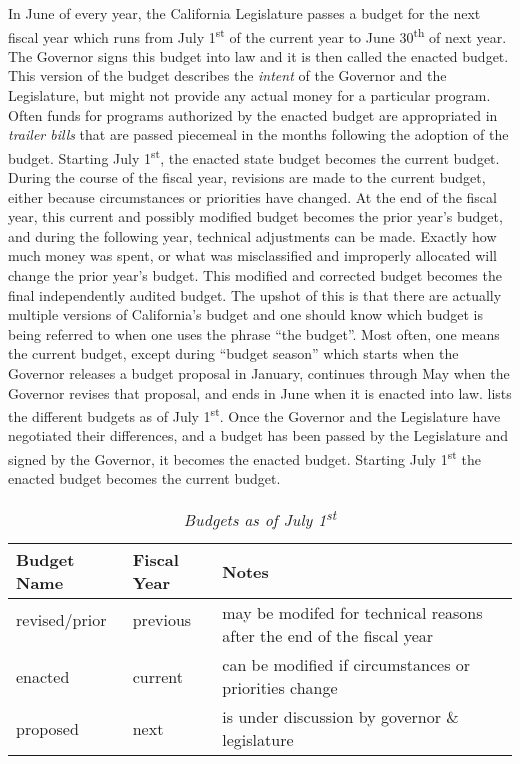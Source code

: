 In June of every year, the California Legislature passes a budget for the next fiscal year which runs from July 1\textsuperscript{st} of the current year to June 30\textsuperscript{th} of next year. The Governor signs this budget into law and it is then called the enacted budget. This version of the budget describes the \textit{intent} of the Governor and the Legislature, but might not provide any actual money for a particular program. Often funds for programs authorized by the enacted budget are appropriated in \textit{trailer bills} that are passed piecemeal in the months following the adoption of the budget. Starting July 1\textsuperscript{st}, the enacted state budget becomes the current budget. During the course of the fiscal year, revisions are made to the current budget, either because circumstances or priorities have changed. At the end of the fiscal year, this current and possibly modified budget becomes the prior year's budget, and during the following year, technical adjustments can be made. Exactly how much money was spent, or what was misclassified and improperly allocated will change the prior year's budget. This modified and corrected budget becomes the final independently audited budget. The upshot of this is that there are actually multiple versions of California's budget and one should know which budget is being referred to when one uses the phrase ``the budget''. Most often, one means the current budget, except during ``budget season'' which starts when the Governor releases a budget proposal in January, continues through May when the Governor revises that proposal, and ends in June when it is enacted into law.  lists the different budgets as of July 1\textsuperscript{st}. Once the Governor and the Legislature have negotiated their differences, and a budget has been passed by the Legislature and signed by the Governor, it becomes the enacted budget. Starting July 1\textsuperscript{st} the enacted budget becomes the current budget.

\begin{table}[ht]
  \caption[Budgets as of July 1\textsuperscript{st}]{\textit{Budgets as of July 1\textsuperscript{st}}}%
  \label{tab:july_1_budgets}%
  \begin{tabularx}{\textwidth}{lll}
    \toprule
    \textbf{Budget Name} & \textbf{Fiscal Year} & \textbf{Notes}\\
    \midrule
    revised/prior  & previous & \multirow[t]{2}{3in}{may be modifed for technical reasons after the end of the fiscal year}\\\vspace{3ex}\\
    enacted  & current  & can be modified if circumstances or priorities change\vspace{2ex}\\
    proposed & next     & is under discussion by governor \& legislature\\
    \bottomrule
  \end{tabularx}
\end{table}

